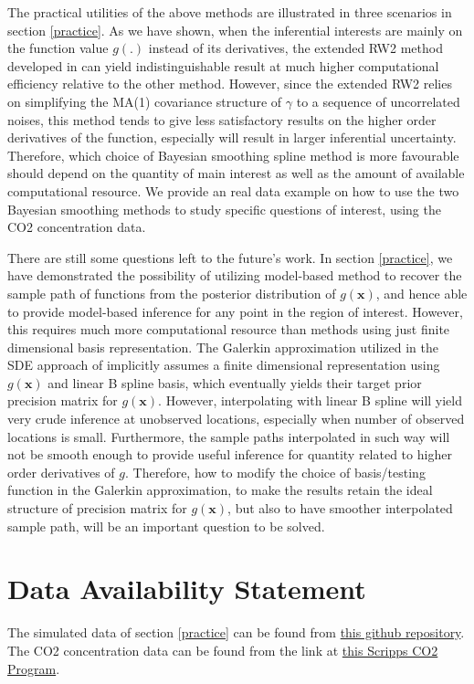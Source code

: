 \documentclass{article}
\begin{document}
The practical utilities of the above methods are illustrated in three scenarios in section \ref{practice}. As we have shown, when the inferential interests are mainly on the function value $g(.)$ instead of its derivatives, the extended RW2 method developed in \cite{rw2} can yield indistinguishable result at much higher computational efficiency relative to the other method. However, since the extended RW2 relies on simplifying the MA(1) covariance structure of $\gamma$ to a sequence of uncorrelated noises, this method tends to give less satisfactory results on the higher order derivatives of the function, especially will result in larger inferential uncertainty. Therefore, which choice of Bayesian smoothing spline method is more favourable should depend on the quantity of main interest as well as the amount of available computational resource. We provide an real data example on how to use the two Bayesian smoothing methods to study specific questions of interest, using the CO2 concentration data.


There are still some questions left to the future's work. In section \ref{practice}, we have demonstrated the possibility of utilizing model-based method to recover the sample path of functions from the posterior distribution of $g(\boldsymbol{x})$, and hence able to provide model-based inference for any point in the region of interest. However, this requires much more computational resource than methods using just finite dimensional basis representation. The Galerkin approximation utilized in the SDE approach of \cite{rw2} implicitly assumes a finite dimensional representation using $g(\boldsymbol{x})$ and linear B spline basis, which eventually yields their target prior precision matrix for $g(\boldsymbol{x})$. However, interpolating with linear B spline will yield very crude inference at unobserved locations, especially when number of observed locations is small. Furthermore, the sample paths interpolated in such way will not be smooth enough to provide useful inference for quantity related to higher order derivatives of $g$. Therefore, how to modify the choice of basis/testing function in the Galerkin approximation, to make the results retain the ideal structure of precision matrix for $g(\boldsymbol{x})$, but also to have smoother interpolated sample path, will be an important question to be solved.









\section*{Data Availability Statement}
The simulated data of section \ref{practice} can be found from \href{https://github.com/AgueroZZ/research_comps/tree/main}{this github repository}. The CO2 concentration data can be found from the link at \href{https://scrippsco2.ucsd.edu}{this Scripps CO2 Program}.
\end{document}
